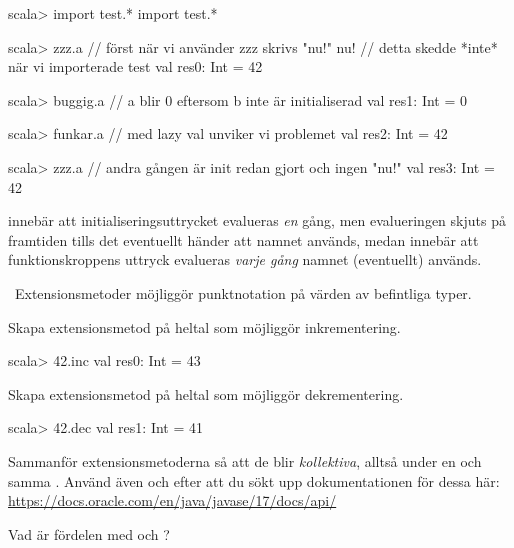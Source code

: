 \SubtaskSolved
\begin{REPL}
scala> import test.*
import test.*

scala> zzz.a      // först när vi använder zzz skrivs "nu!"
nu!               // detta skedde *inte* när vi importerade test
val res0: Int = 42

scala> buggig.a   // a blir 0 eftersom b inte är initialiserad
val res1: Int = 0

scala> funkar.a   // med lazy val unviker vi problemet
val res2: Int = 42


scala> zzz.a     // andra gången är init redan gjort och ingen "nu!"
val res3: Int = 42
\end{REPL}

\SubtaskSolved {} innebär att initialiseringsuttrycket evalueras \emph{en} gång, men evalueringen skjuts på framtiden tills det eventuellt händer att namnet  används, medan  innebär att funktionskroppens uttryck evalueras \emph{varje gång} namnet  (eventuellt) används.


\QUESTEND




\QUESTBEGIN

\Task \what~Extensionsmetoder möjliggör punktnotation på värden av befintliga typer.

\Subtask Skapa extensionsmetod på heltal som möjliggör inkrementering. 
\begin{REPLnonum}
scala> 42.inc
val res0: Int = 43
\end{REPLnonum} 

\Subtask Skapa extensionsmetod på heltal som möjliggör dekrementering.
\begin{REPLnonum}
scala> 42.dec
val res1: Int = 41
\end{REPLnonum}

\Subtask Sammanför extensionsmetoderna så att de blir \emph{kollektiva}, alltså under en och samma . Använd även  och  efter att du sökt upp dokumentationen för dessa här: \url{https://docs.oracle.com/en/java/javase/17/docs/api/}

\Subtask Vad är fördelen med   och ?



\SOLUTION

\TaskSolved \what~

